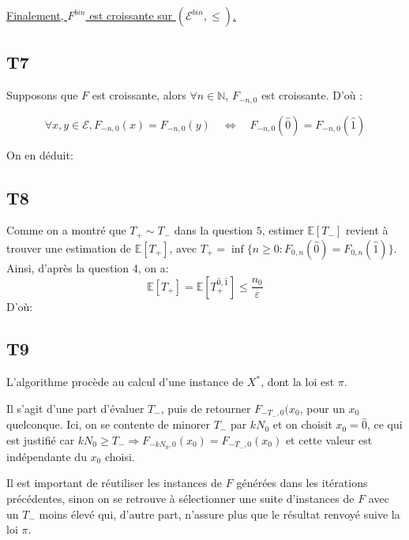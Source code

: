 \documentclass[a4paper,11pt]{article}
\def \E{\mathcal{E}}
\def \esp{\mathbb{E}}
\begin{document}
\begin{center}
 \underline{Finalement, $F^{bin}$ est croissante sur  $(\E^{bin},\le)$.}
\end{center}

\subsection*{T7}
Supposons que $F$ est croissante, alors $\forall n \in \mathbb{N}$, $F_{-n,0}$ est croissante. D'où :


 \[\forall x,y \in \E, F_{-n,0}(x)=F_{-n,0}(y)\quad \iff \quad F_{-n,0}(\hat{0})=F_{-n,0}(\hat{1})\]

On en déduit:
\begin{center}
\end{center}

\subsection*{T8}
Comme on a montré que $T_+ \sim T_-$ dans la question $5$, estimer $\mathbb{E}[T_-]$ revient à trouver une estimation de $\mathbb{E}[T_+]$, avec $T_+=\inf\{n\geq 0: F_{0,n}(\hat{0})=F_{0,n}(\hat{1})\}$.\\
Ainsi, d'après la question 4, on a:
\[\esp[T_+]=\esp[T_+^{\hat{0},\hat{1}}]\leq \frac{n_0}{\varepsilon}\] 
D'où:
\begin{center}
\fbox{\begin{minipage}{0.5\textwidth}
\[\esp[T_-]\leq \frac{n_0}{\varepsilon}\] 
\end{minipage}}
\end{center}

\subsection*{T9}
L'algorithme procède au calcul d'une instance de $X^*$, dont la loi est $\pi$. 

Il s'agit d'une part d'évaluer $T_-$, puis de retourner $F_{-T_-,0}(x_0$, pour un $x_0$ quelconque. Ici, on se contente de minorer $T_-$ par $kN_0$ et on choisit $x_0 = \hat{0}$, ce qui est justifié car $kN_0 \ge T_- \Rightarrow F_{-kN_0,0}(x_0) = F_{-T_-,0}(x_0)$ et cette valeur est indépendante du $x_0$ choisi.

Il est important de réutiliser les instances de $F$ générées dans les itérations précédentes, sinon on se retrouve à sélectionner une suite d'instances de $F$ avec un $T_-$ moins élevé qui, d'autre part, n'assure plus que le résultat renvoyé suive la loi $\pi$.
\end{document}

